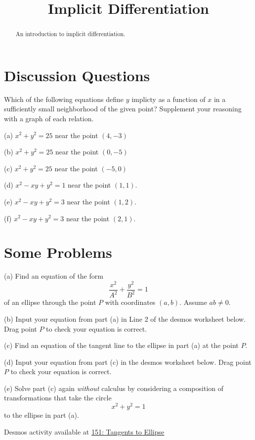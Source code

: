 \documentclass{ximera}
\title{Implicit Differentiation}
\begin{document}
\begin{abstract}
An introduction to implicit differentiation.
\end{abstract}
\maketitle

\section*{Discussion Questions}

\begin{question}  \label{Q:dsftr4tr656t}
Which of the following equations define $y$ implicty as a function of $x$ in a sufficiently small neighborhood of the given point? Supplement your reasoning with a graph of each relation.

(a) $x^2 + y^2 = 25$ near the point $(4,-3)$

(b) $x^2 + y^2 = 25$ near the point $(0,-5)$

(c) $x^2 + y^2 = 25$ near the point $(-5,0)$

(d) $x^2 - xy + y^2 = 1$ near the point $(1,1)$.

(e) $x^2 - xy + y^2 = 3$ near the point $(1,2)$.

(f) $x^2 - xy + y^2 = 3$ near the point $(2,1)$.

\end{question}

\section*{Some Problems}

\begin{question}  \label{Q:4bbfdellk}
(a) Find an equation of the form 
\[
   \frac{x^2}{A^2} + \frac{y^2}{B^2} = 1
\]
of an ellipse through the point $P$ with coordinates $(a,b)$. Assume $ab\neq 0$.

(b) Input your equation from part (a) in Line 2 of the desmos worksheet below. Drag point $P$ to check your equation is correct.

(c) Find an equation of the tangent line to the ellipse in part (a) at the point $P$.

(d) Input your equation from part (c) in the desmos worksheet below. Drag point $P$ to check your equation is correct.

(e) Solve part (c) again \emph{without} calculus by considering a composition of transformations that take the circle
\[
       x^2 + y^2 = 1
\]
to the ellipse in part (a).

\begin{onlineOnly}
    \begin{center}
\end{center}
\end{onlineOnly}

Desmos activity available at \href{https://www.desmos.com/calculator/jl0nyqwukz}{151: Tangents to Ellipse}

\end{question}
\end{document}
